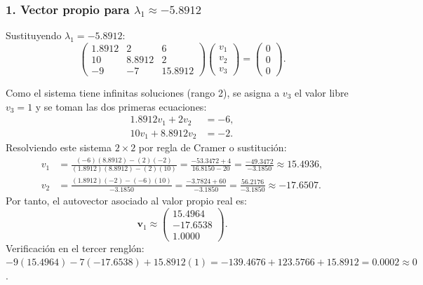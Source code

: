\documentclass[spanish,letterpaper,oneside]{article}
\begin{document}
\subsubsection*{1. Vector propio para $\lambda_1 \approx -5.8912$}
Sustituyendo $\lambda_1 = -5.8912$:
\begin{equation}
\begin{pmatrix}
1.8912 & 2 & 6 \\
10 & 8.8912 & 2 \\
-9 & -7 & 15.8912
\end{pmatrix}
\begin{pmatrix} v_1 \\ v_2 \\ v_3 \end{pmatrix} =
\begin{pmatrix} 0 \\ 0 \\ 0 \end{pmatrix}.
\end{equation}

Como el sistema tiene infinitas soluciones (rango 2), se asigna a $v_3$ el valor libre $v_3 = 1$ y se toman las dos primeras ecuaciones:
\begin{equation}
\begin{aligned}
1.8912 v_1 + 2 v_2 &= -6, \\
10 v_1 + 8.8912 v_2 &= -2.
\end{aligned}
\end{equation}
Resolviendo este sistema $2 \times 2$ por regla de Cramer o sustitución:
\begin{align}
v_1 &= \frac{(-6)(8.8912) - (2)(-2)}{(1.8912)(8.8912) - (2)(10)} = \frac{-53.3472 + 4}{16.8150 - 20} = \frac{-49.3472}{-3.1850} \approx 15.4936, \\
v_2 &= \frac{(1.8912)(-2) - (-6)(10)}{-3.1850} = \frac{-3.7824 + 60}{-3.1850} = \frac{56.2176}{-3.1850} \approx -17.6507.
\end{align}
Por tanto, el autovector asociado al valor propio real es:
\begin{equation}
\mathbf{v}_1 \approx \begin{pmatrix} 15.4964 \\ -17.6538 \\ 1.0000 \end{pmatrix}.
\end{equation}
Verificación en el tercer renglón: $-9(15.4964) - 7(-17.6538) + 15.8912(1) = -139.4676 + 123.5766 + 15.8912 = 0.0002 \approx 0$.
\end{document}
